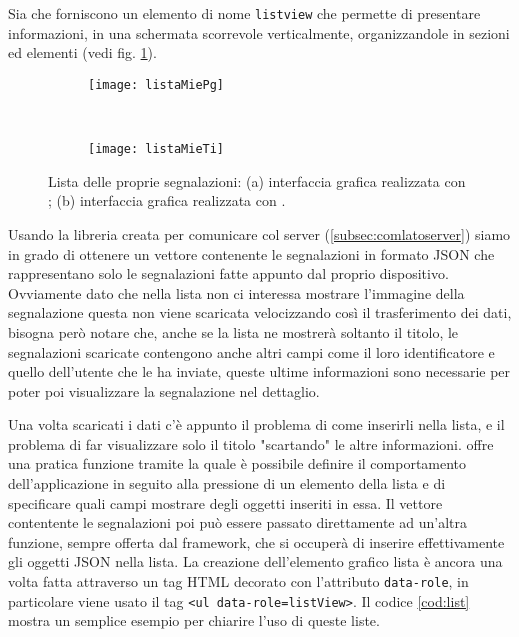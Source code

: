 			Sia \kendomob{} che \tisdk{} forniscono un elemento di nome \texttt{listview}
			che permette di presentare informazioni, in una schermata scorrevole 
			verticalmente, organizzandole in sezioni ed elementi (vedi fig. \ref{fig:mieTiPg}).
			
			\begin{figure}[H]
              \centering
              \begin{subfigure}[b]{0.485\textwidth}
                \texttt{[image: listaMiePg]}
                \caption{}
              \end{subfigure}
              ~
              \begin{subfigure}[b]{0.485\textwidth}
                \texttt{[image: listaMieTi]}
                \caption{}
              \end{subfigure}
              \caption{Lista delle  proprie segnalazioni: 
                (a) interfaccia grafica realizzata con \kendomob{}; 
                (b) interfaccia grafica realizzata con \tisdk{}.
  				}
              \label{fig:mieTiPg}
            \end{figure}

			\noindent Usando la libreria creata per comunicare col server (\ref{subsec:comlatoserver})
			siamo in grado di ottenere un vettore contenente le segnalazioni in formato JSON che 
			rappresentano solo le segnalazioni fatte appunto dal proprio dispositivo. 
			Ovviamente dato che nella lista non ci interessa mostrare l'immagine della segnalazione
			questa non viene scaricata velocizzando così il 
			trasferimento dei dati, bisogna però notare che, anche se la lista 
			ne mostrerà soltanto il titolo, le segnalazioni scaricate contengono 
			anche altri campi come il loro identificatore e quello dell'utente 
			che le ha inviate, queste ultime informazioni sono necessarie per 
			poter poi visualizzare la segnalazione nel dettaglio.
			
			Una volta scaricati i dati c'è appunto il problema di come inserirli 
			nella lista, e il problema di far visualizzare solo il titolo 
			"scartando" le altre informazioni.
			\kendomob{} offre una pratica funzione \js{} tramite la quale è 
			possibile definire il comportamento dell'applicazione in seguito 
			alla pressione di un elemento della lista e di specificare quali 
			campi mostrare degli oggetti inseriti in essa. Il vettore contentente le segnalazioni
			poi può essere passato direttamente ad un'altra funzione,
			sempre offerta dal framework, che si occuperà di inserire effettivamente 
			gli oggetti JSON nella lista.
			La creazione dell'elemento grafico lista è ancora una volta fatta 
			attraverso un tag HTML decorato con l'attributo \texttt{data-role}, 
			in particolare viene usato il tag \texttt{<ul data-role=listView>}.
			Il codice \ref{cod:list} mostra un semplice esempio per 
			chiarire l'uso di queste liste.
			
